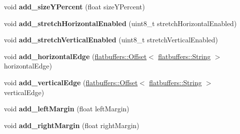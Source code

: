 \begin{DoxyCompactItemize}
\mbox{\label{structflatbuffers_1_1LayoutComponentTableBuilder_a88280c4b428c82f0ba8eb1a57093cd2d}} 
void {\bfseries add\+\_\+size\+Y\+Percent} (float size\+Y\+Percent)
\item 
\mbox{\label{structflatbuffers_1_1LayoutComponentTableBuilder_a77836b3399e4634028c04bdde1f626c4}} 
void {\bfseries add\+\_\+stretch\+Horizontal\+Enabled} (uint8\+\_\+t stretch\+Horizontal\+Enabled)
\item 
\mbox{\label{structflatbuffers_1_1LayoutComponentTableBuilder_a0df1cb675e7866e95b3cf8d1f39e8ebb}} 
void {\bfseries add\+\_\+stretch\+Vertical\+Enabled} (uint8\+\_\+t stretch\+Vertical\+Enabled)
\item 
\mbox{\label{structflatbuffers_1_1LayoutComponentTableBuilder_a4141539957b9bba70b52ee7ff581815e}} 
void {\bfseries add\+\_\+horizontal\+Edge} (\hyperlink{structflatbuffers_1_1Offset}{flatbuffers\+::\+Offset}$<$ \hyperlink{structflatbuffers_1_1String}{flatbuffers\+::\+String} $>$ horizontal\+Edge)
\item 
\mbox{\label{structflatbuffers_1_1LayoutComponentTableBuilder_aa7a709b341f4b4b62d538a2db9bcde43}} 
void {\bfseries add\+\_\+vertical\+Edge} (\hyperlink{structflatbuffers_1_1Offset}{flatbuffers\+::\+Offset}$<$ \hyperlink{structflatbuffers_1_1String}{flatbuffers\+::\+String} $>$ vertical\+Edge)
\item 
\mbox{\label{structflatbuffers_1_1LayoutComponentTableBuilder_a2d6a674e3edb4f2c7b7a426f628aaeff}} 
void {\bfseries add\+\_\+left\+Margin} (float left\+Margin)
\item 
\mbox{\label{structflatbuffers_1_1LayoutComponentTableBuilder_a62758a856c7dd7093684ffbcec7f7d15}} 
void {\bfseries add\+\_\+right\+Margin} (float right\+Margin)
\item 
\mbox{\label{structflatbuffers_1_1LayoutComponentTableBuilder_afde69f207294bf7b0b4097c6f31f0304}} 

\end{DoxyCompactItemize}
